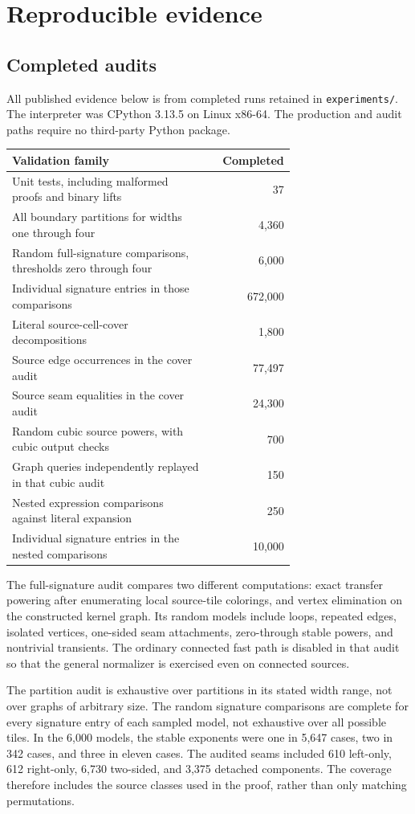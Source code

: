 \documentclass[11pt]{article}
\theoremstyle{remark}\newtheorem{remark}[theorem]{Remark}
\DeclareRobustCommand{\code}[1]{\nolinkurl{#1}}
\begin{document}
\section{Reproducible evidence}
\subsection{Completed audits}
All published evidence below is from completed runs retained in \code{experiments/}. The interpreter was CPython 3.13.5 on Linux x86-64. The production and audit paths require no third-party Python package.
\begin{center}
\begin{tabular}{p{0.70\linewidth}r}\toprule
Validation family & Completed\\\midrule
Unit tests, including malformed proofs and binary lifts & 37\\
All boundary partitions for widths one through four & 4,360\\
Random full-signature comparisons, thresholds zero through four & 6,000\\
Individual signature entries in those comparisons & 672,000\\
Literal source-cell-cover decompositions & 1,800\\
Source edge occurrences in the cover audit & 77,497\\
Source seam equalities in the cover audit & 24,300\\
Random cubic source powers, with cubic output checks & 700\\
Graph queries independently replayed in that cubic audit & 150\\
Nested expression comparisons against literal expansion & 250\\
Individual signature entries in the nested comparisons & 10,000\\\bottomrule
\end{tabular}
\end{center}
The full-signature audit compares two different computations: exact transfer powering after enumerating local source-tile colorings, and vertex elimination on the constructed kernel graph. Its random models include loops, repeated edges, isolated vertices, one-sided seam attachments, zero-through stable powers, and nontrivial transients. The ordinary connected fast path is disabled in that audit so that the general normalizer is exercised even on connected sources.

The partition audit is exhaustive over partitions in its stated width range, not over graphs of arbitrary size. The random signature comparisons are complete for every signature entry of each sampled model, not exhaustive over all possible tiles. In the 6,000 models, the stable exponents were one in 5,647 cases, two in 342 cases, and three in eleven cases. The audited seams included 610 left-only, 612 right-only, 6,730 two-sided, and 3,375 detached components. The coverage therefore includes the source classes used in the proof, rather than only matching permutations.
\end{document}
